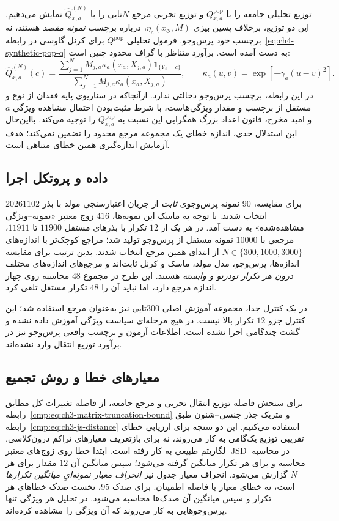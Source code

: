 توزیع تحلیلی جامعه را با $Q_{x,a}^{\mathrm{pop}}$
و توزیع تجربی مرجع $N$تایی را با
$\widehat Q_{x,a}^{(N)}$ نمایش می‌دهیم.
این دو توزیع، برخلاف پسین بیزی
$\eta_c(x_{\mathcal O},M)$، درباره برچسب
\emph{نمونه مقصد} هستند، نه برچسب خود پرس‌وجو.
فرمول تحلیلی $Q^{\mathrm{pop}}$ برای کرنل گاوسی
در رابطه~\eqref{eq:ch4-synthetic-pop-q}
به دست آمده است. برآورد متناظر با گراف محدود چنین است:
\begin{equation}\label{eq:ch4-q-empirical}
\widehat Q_{x,a}^{(N)}(c)=
\frac{\sum_{j=1}^{N}
M_{j,a}\kappa_a(x_a,X_{j,a})\mathbf1_{\{Y_j=c\}}}
{\sum_{j=1}^{N}M_{j,a}\kappa_a(x_a,X_{j,a})},
\qquad
\kappa_a(u,v)=\exp[-\gamma_a(u-v)^2].
\end{equation}
در این رابطه، برچسب پرس‌وجو دخالتی ندارد.
ازآنجاکه در سناریوی پایه فقدان از نوع
 و مستقل از برچسب و مقدار ویژگی‌هاست،
با شرط مثبت‌بودن احتمال مشاهده ویژگی $a$
و امید مخرج، قانون اعداد بزرگ همگرایی این نسبت
به $Q_{x,a}^{\mathrm{pop}}$ را توجیه می‌کند.
بااین‌حال این استدلال حدی، اندازه خطای یک
مجموعه مرجع محدود را تضمین نمی‌کند؛ هدف آزمایش
اندازه‌گیری همین خطای متناهی است.

\subsection{داده و پروتکل اجرا}
\label{subsec:ch4-q-protocol}
برای مقایسه، $90$ نمونه پرس‌وجوی
\emph{ثابت} از جریان اعتبارسنجی مولد
با بذر $20261102$ انتخاب شدند.
با توجه به ماسک این نمونه‌ها، $416$ زوج معتبر
«نمونه--ویژگی مشاهده‌شده» به دست آمد.
در هر یک از $12$ تکرار با بذرهای مستقل
$11900$ تا $11911$، مرجعی با $10000$
نمونه مستقل از پرس‌وجو تولید شد؛ مراجع کوچک‌تر
با اندازه‌های $N\in\{300,1000,3000\}$
از ابتدای همین مرجع انتخاب شدند.
بدین ترتیب برای مقایسه اندازه‌ها، پرس‌وجو،
مدل مولد، ماسک و کرنل ثابت‌اند و
مرجع‌های اندازه‌های مختلف \emph{درون هر تکرار
تو‌در‌تو و وابسته} هستند. این طرح
در مجموع $48$ محاسبه روی چهار اندازه مرجع دارد،
اما نباید آن را $48$ تکرار مستقل تلقی کرد.

در یک کنترل جدا، مجموعه آموزش اصلی
$300$تایی نیز به‌عنوان مرجع استفاده شد؛
این کنترل جزو $12$ تکرار بالا نیست.
در هیچ مرحله‌ای سیاست ویژگی آموزش داده نشده
و گشت چندگامی اجرا نشده است. اطلاعات آزمون
و برچسب واقعی پرس‌وجو نیز در برآورد توزیع
انتقال وارد نشده‌اند.

\subsection{معیارهای خطا و روش تجمیع}
\label{subsec:ch4-q-metrics}
برای سنجش فاصله توزیع انتقال تجربی و
مرجع جامعه، از فاصله تغییرات کل
مطابق رابطه~\eqref{cmp:eq:ch3-matrix-truncation-bound}
و متریک جذر جنسن--شنون
طبق رابطه~\eqref{cmp:eq:ch3-js-distance}
استفاده می‌کنیم. این دو سنجه برای
ارزیابی خطای تقریبی توزیع یک‌گامی
به کار می‌روند، نه برای بازتعریف
معیارهای تراکم درون‌کلاسی.
در محاسبه $\operatorname{JSD}$ لگاریتم طبیعی
به کار رفته است. ابتدا خطا روی زوج‌های معتبر
محاسبه و برای هر تکرار میانگین گرفته می‌شود؛
سپس میانگین آن $12$ مقدار برای هر $N$
گزارش می‌شود. انحراف معیار جدول نیز
\emph{انحراف معیار نمونه‌ایِ میانگین تکرارها}
است، نه خطای معیار یا فاصله اطمینان.
برای صدک $95$، نخست صدک خطاهای هر تکرار
و سپس میانگین آن صدک‌ها محاسبه می‌شود.
در تحلیل هر ویژگی تنها پرس‌وجوهایی
به کار می‌روند که آن ویژگی را مشاهده کرده‌اند.

